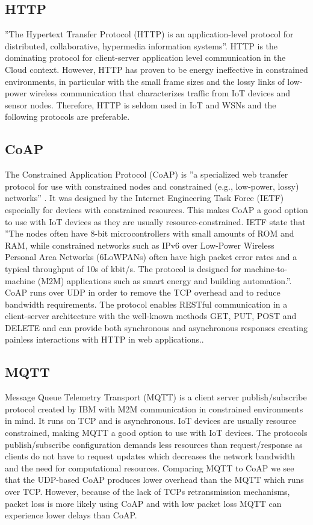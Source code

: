 \documentclass[]{uiophd}
\begin{document}
\subsection{HTTP}
 
''The Hypertext Transfer Protocol (HTTP) is an application-level protocol for distributed, collaborative, hypermedia information systems''\cite{HTTP1996}. HTTP is the dominating protocol for client-server application level communication in the Cloud context. However, HTTP has proven to be energy ineffective in constrained environments, in particular with the small frame sizes and the lossy links of low-power wireless communication that characterizes traffic from IoT devices and sensor nodes\cite{karagiannis2015survey}\cite{7030106}. Therefore, HTTP is seldom used in IoT and WSNs and the following protocols are preferable.

\subsection{CoAP}
The Constrained Application Protocol (CoAP) is ''a specialized web transfer protocol for use with constrained nodes and constrained (e.g., low-power, lossy) networks'' \cite{rfc7252}. It was designed by the Internet Engineering Task Force (IETF) especially for devices with constrained resources. This makes CoAP a good option to use with IoT devices as they are usually resource-constrained. IETF state that ''The nodes often have 8-bit microcontrollers with small amounts of ROM and RAM, while constrained networks such as IPv6 over Low-Power Wireless Personal Area Networks (6LoWPANs) often have high packet error rates and a typical throughput of 10s of kbit/s.  The protocol is designed for machine-to-machine (M2M) applications such as smart energy and building automation.''\cite{rfc7252}. CoAP runs over UDP in order to remove the TCP overhead and to reduce bandwidth requirements. The protocol enables RESTful communication in a client-server architecture with the well-known methods GET, PUT, POST and DELETE and can provide both synchronous and asynchronous responses creating painless interactions with HTTP in web applications.\cite{rfc7252}\cite{karagiannis2015survey}\cite{7030106}.

\subsection{MQTT}
Message Queue Telemetry Transport (MQTT) is a client server publish/subscribe protocol created by IBM with M2M communication in constrained environments in mind. It runs on TCP and is asynchronous. IoT devices are usually resource constrained, making MQTT a good option to use with IoT devices. The protocols publish/subscribe configuration demands less resources than request/response as clients do not have to request updates which decreases the network bandwidth and the need for computational resources. Comparing MQTT to CoAP we see that the UDP-based CoAP produces lower overhead than the MQTT which runs over TCP. However, because of the lack of TCPs retransmission mechanisms, packet loss is more likely using CoAP and with low packet loss MQTT can experience lower delays than CoAP\cite{karagiannis2015survey}.
\end{document}
